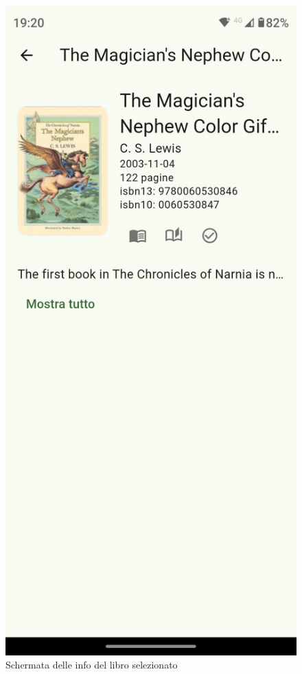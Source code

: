 \documentclass{article}
\begin{document}
\begin{figure}[H]
  \centering
  \includegraphics[width=0.6\linewidth]{book-screen-f.png}
  \caption{Schermata delle info del libro selezionato}
  \label{fig:sitemap}
\end{figure}
\end{document}
